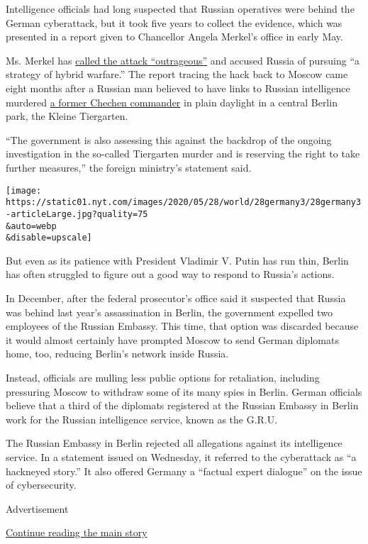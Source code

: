 Intelligence officials had long suspected that Russian operatives were
behind the German cyberattack, but it took five years to collect the
evidence, which was presented in a report given to Chancellor Angela
Merkel's office in early May.

Ms. Merkel has
\href{https://www.nytimes.com/2020/05/13/world/europe/merkel-russia-cyberattack.html}{called
the attack ``outrageous''} and accused Russia of pursuing ``a strategy
of hybrid warfare.'' The report tracing the hack back to Moscow came
eight months after a Russian man believed to have links to Russian
intelligence murdered
\href{https://www.nytimes.com/2019/12/04/world/europe/germany-assassination-russia.html}{a
former Chechen commander} in plain daylight in a central Berlin park,
the Kleine Tiergarten.

``The government is also assessing this against the backdrop of the
ongoing investigation in the so-called Tiergarten murder and is
reserving the right to take further measures,'' the foreign ministry's
statement said.

\texttt{[image: https://static01.nyt.com/images/2020/05/28/world/28germany3/28germany3-articleLarge.jpg?quality=75\\\&auto=webp\\\&disable=upscale]}

But even as its patience with President Vladimir V. Putin has run thin,
Berlin has often struggled to figure out a good way to respond to
Russia's actions.

In December, after the federal prosecutor's office said it suspected
that Russia was behind last year's assassination in Berlin, the
government expelled two employees of the Russian Embassy. This time,
that option was discarded because it would almost certainly have
prompted Moscow to send German diplomats home, too, reducing Berlin's
network inside Russia.

Instead, officials are mulling less public options for retaliation,
including pressuring Moscow to withdraw some of its many spies in
Berlin. German officials believe that a third of the diplomats
registered at the Russian Embassy in Berlin work for the Russian
intelligence service, known as the G.R.U.

The Russian Embassy in Berlin rejected all allegations against its
intelligence service. In a statement issued on Wednesday, it referred to
the cyberattack as ``a hackneyed story.'' It also offered Germany a
``factual expert dialogue'' on the issue of cybersecurity.

Advertisement

\protect\hyperlink{after-bottom}{Continue reading the main story}

